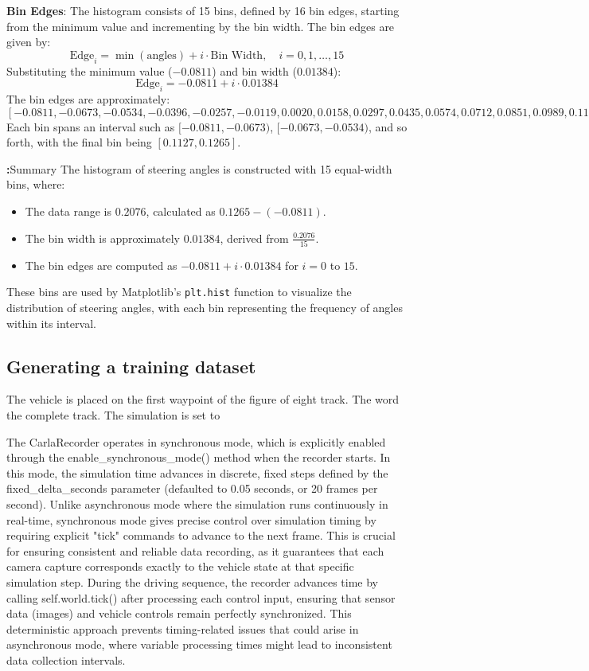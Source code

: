\textbf{Bin Edges}: 
The histogram consists of 15 bins, defined by 16 bin edges, starting from the minimum value and incrementing by the bin width. The bin edges are given by:
\begin{equation}
\text{Edge}_i = \min(\text{angles}) + i \cdot \text{Bin Width}, \quad i = 0, 1, \ldots, 15
\end{equation}
Substituting the minimum value ($-0.0811$) and bin width ($0.01384$):
\begin{equation}
\text{Edge}_i = -0.0811 + i \cdot 0.01384
\end{equation}
The bin edges are approximately:
\[
[-0.0811, -0.0673, -0.0534, -0.0396, -0.0257, -0.0119, 0.0020, 0.0158, 0.0297, 0.0435, 0.0574, 0.0712, 0.0851, 0.0989, 0.1127, 0.1265]
\]
Each bin spans an interval such as $[-0.0811, -0.0673)$, $[-0.0673, -0.0534)$, and so forth, with the final bin being $[0.1127, 0.1265]$.

\textbf:{Summary}
The histogram of steering angles is constructed with 15 equal-width bins, where:
\begin{itemize}
    \item The data range is $0.2076$, calculated as $0.1265 - (-0.0811)$.
    \item The bin width is approximately $0.01384$, derived from $\frac{0.2076}{15}$.
    \item The bin edges are computed as $-0.0811 + i \cdot 0.01384$ for $i = 0$ to $15$.
\end{itemize}
These bins are used by Matplotlib's \texttt{plt.hist} function to visualize the distribution of steering angles, with each bin representing the frequency of angles within its interval.

\subsection{Generating a training dataset}

The vehicle is placed on the first waypoint of the figure of eight track. The word the complete track. The simulation is set to 

The CarlaRecorder operates in synchronous mode, which is explicitly enabled through the enable\_synchronous\_mode() method when the recorder starts. In this mode, the simulation time advances in discrete, fixed steps defined by the fixed\_delta\_seconds parameter (defaulted to 0.05 seconds, or 20 frames per second). Unlike asynchronous mode where the simulation runs continuously in real-time, synchronous mode gives precise control over simulation timing by requiring explicit "tick" commands to advance to the next frame. This is crucial for ensuring consistent and reliable data recording, as it guarantees that each camera capture corresponds exactly to the vehicle state at that specific simulation step. During the driving sequence, the recorder advances time by calling self.world.tick() after processing each control input, ensuring that sensor data (images) and vehicle controls remain perfectly synchronized. This deterministic approach prevents timing-related issues that could arise in asynchronous mode, where variable processing times might lead to inconsistent data collection intervals.

